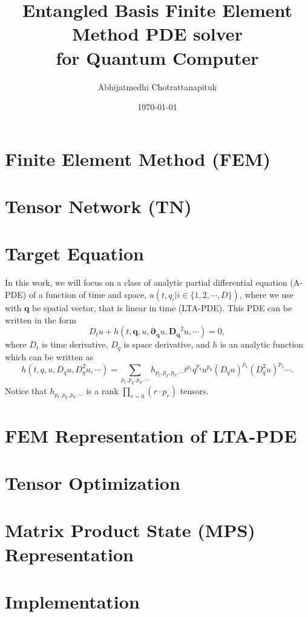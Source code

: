 \documentclass[preprint, 12pt]{revtex4-2}
\numberwithin{equation}{section}
\begin{document}
\title{Entangled Basis Finite Element Method PDE solver\\for Quantum Computer}

\author{Abhijatmedhi Chotrattanapituk}

\date{\today}

\maketitle
\section{Finite Element Method (FEM)}
\section{Tensor Network (TN)}
\section{Target Equation}
In this work, we will focus on a class of analytic partial differential equation (A-PDE) of a function of time and space, $u(t, q_i|i\in\{1, 2, \cdots, D\})$, where we use  with $\mathbf{q}$ be spatial vector, that is linear in time (LTA-PDE). This PDE can be written in the form
\begin{equation}
    D_tu + h\left(t, \mathbf{q}, u, \mathbf{\partial_q}u, \mathbf{D_q}^2u, \cdots \right) = 0,
\end{equation}
where $D_t$ is time derivative, $D_q$ is space derivative, and $h$ is an analytic function which can be written as
\begin{equation}
    h\left(t, q, u, D_qu, D_q^2u, \cdots\right) = \sum_{p_t, p_q, p_0,\cdots}h_{p_t, p_q, p_0,\cdots}t^{p_t}q^{p_q}u^{p_0}\left(D_qu\right)^{p_1}\left(D_q^2u\right)^{p_2}\cdots.
\end{equation}
Notice that $h_{p_t, p_q, p_0,\cdots}$ is a rank $\prod_{r=0} (r\cdot p_r)$ tensors.
\section{FEM Representation of LTA-PDE}
\section{Tensor Optimization}
\section{Matrix Product State (MPS) Representation}
\section{Implementation}
\end{document}
